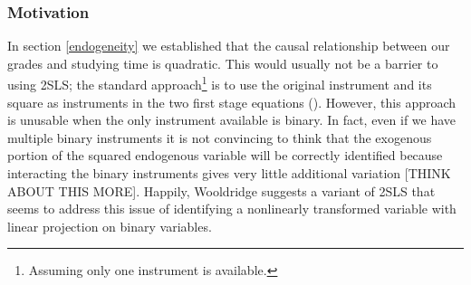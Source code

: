 \documentclass[12pt]{article}
\begin{document}
\subsubsection{Motivation}
In section \ref{endogeneity} we established that the causal relationship between our grades and studying time is quadratic. This would usually not be a barrier to using 2SLS; the standard approach\footnote{Assuming only one instrument is available.} is to use the original instrument and its square as instruments in the two first stage equations (\cite{harmless}). However, this approach is unusable when the only instrument available is binary. In fact, even if we have multiple binary instruments it is not convincing to think that the exogenous portion of the squared endogenous variable will be correctly identified because interacting the binary instruments gives very little additional variation \textcolor{BrickRed}{[THINK ABOUT THIS MORE]}. Happily, Wooldridge suggests a variant of 2SLS that seems to address this issue of identifying a nonlinearly transformed variable with linear projection on binary variables.

\end{document}
